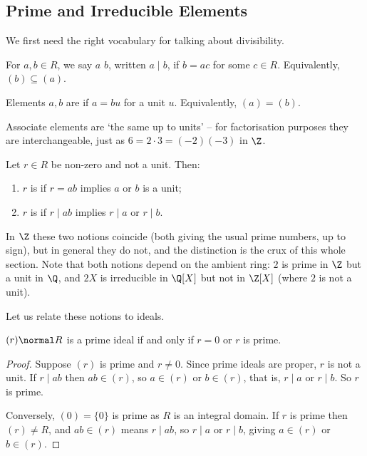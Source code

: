 \subsection{Prime and Irreducible Elements}

We first need the right vocabulary for talking about divisibility.

\begin{definition}
	For $a, b \in R$, we say $a$  $b$, written $a \mid b$, if $b = ac$ for some $c \in R$. Equivalently, $(b) \subseteq (a)$.

	Elements $a, b$ are  if $a = bu$ for a unit $u$. Equivalently, $(a) = (b)$.
\end{definition}

Associate elements are `the same up to units' -- for factorisation purposes they are interchangeable, just as $6 = 2 \cdot 3 = (-2)(-3)$ in $\Z$.

\begin{definition}
	Let $r \in R$ be non-zero and not a unit. Then:
	\begin{enumerate}[label=(\roman*)]
		\item $r$ is  if $r = ab$ implies $a$ or $b$ is a unit;
		\item $r$ is  if $r \mid ab$ implies $r \mid a$ or $r \mid b$.
	\end{enumerate}
\end{definition}

In $\Z$ these two notions coincide (both giving the usual prime numbers, up to sign), but in general they do not, and the distinction is the crux of this whole section. Note that both notions depend on the ambient ring: $2$ is prime in $\Z$ but a unit in $\Q$, and $2X$ is irreducible in $\Q[X]$ but not in $\Z[X]$ (where $2$ is not a unit).

Let us relate these notions to ideals.

\begin{lemma}
	$(r) \normal R$ is a prime ideal if and only if $r = 0$ or $r$ is prime.
\end{lemma}
\begin{proof}
	Suppose $(r)$ is prime and $r \neq 0$. Since prime ideals are proper, $r$ is not a unit. If $r \mid ab$ then $ab \in (r)$, so $a \in (r)$ or $b \in (r)$, that is, $r \mid a$ or $r \mid b$. So $r$ is prime.

	Conversely, $(0) = \{0\}$ is prime as $R$ is an integral domain. If $r$ is prime then $(r) \neq R$, and $ab \in (r)$ means $r \mid ab$, so $r \mid a$ or $r \mid b$, giving $a \in (r)$ or $b \in (r)$.
\end{proof}

